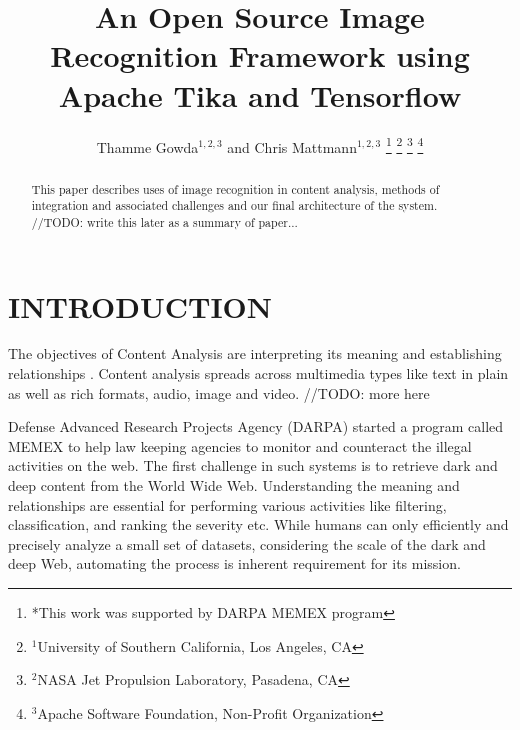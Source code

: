 \documentclass[letterpaper, 10 pt, conference]{ieeeconf}  %
\title{\bf An Open Source Image Recognition Framework using Apache Tika and Tensorflow}
\author{Thamme Gowda$^{1,2,3}$ and Chris Mattmann$^{1,2,3}$%
\thanks{*This work was supported by DARPA MEMEX program}%
\thanks{$^{1}$University of Southern California, Los Angeles, CA }%
\thanks{$^{2}$NASA Jet Propulsion Laboratory, Pasadena, CA }%
\thanks{$^{3}$Apache Software Foundation, Non-Profit Organization}%
}
\begin{document}
\maketitle
\thispagestyle{empty}
\pagestyle{empty}


\begin{abstract}
This paper describes uses of image recognition in content analysis, methods of integration and associated challenges and our final architecture of the system. //TODO: write this later as a summary of paper...
\end{abstract}


\section{INTRODUCTION}
The objectives of Content Analysis are interpreting its meaning and establishing relationships \cite{}. Content analysis spreads across multimedia types like text in plain as well as rich formats, audio, image and video. //TODO: more here


Defense Advanced Research Projects Agency (DARPA) started a program called MEMEX\cite{} to help law keeping agencies to monitor and counteract the illegal activities on the web. The first challenge in such systems is to retrieve dark and deep content from the World Wide Web. Understanding the meaning and relationships are essential for performing various activities like filtering, classification, and ranking the severity etc. While humans can only efficiently and precisely analyze a small set of datasets, considering the scale of the dark and deep Web, automating the process is inherent requirement for its mission.
\end{document}
